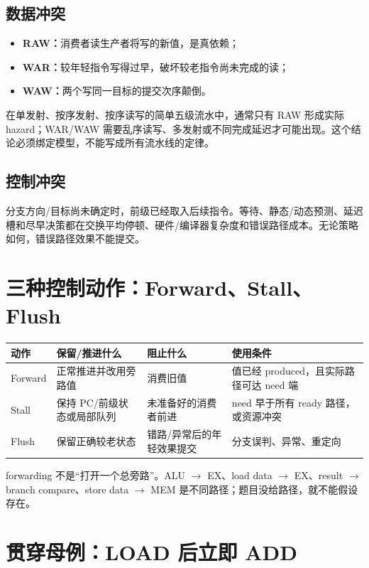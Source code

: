 \documentclass[UTF8,fontset=fandol,11pt,a4paper]{ctexart}
\newcommand{\kw}[1]{\textbf{\color{deep}#1}}
\begin{document}
\subsection{数据冲突}
\begin{itemize}
  \item \kw{RAW：}消费者读生产者将写的新值，是真依赖；
  \item \kw{WAR：}较年轻指令写得过早，破坏较老指令尚未完成的读；
  \item \kw{WAW：}两个写同一目标的提交次序颠倒。
\end{itemize}

在单发射、按序发射、按序读写的简单五级流水中，通常只有 RAW 形成实际 hazard；WAR/WAW 需要乱序读写、多发射或不同完成延迟才可能出现。这个结论必须绑定模型，不能写成所有流水线的定律。

\subsection{控制冲突}
分支方向/目标尚未确定时，前级已经取入后续指令。等待、静态/动态预测、延迟槽和尽早决策都在交换平均停顿、硬件/编译器复杂度和错误路径成本。无论策略如何，错误路径效果不能提交。

\section{三种控制动作：Forward、Stall、Flush}

\begin{center}
\small
\begin{tabularx}{\linewidth}{L{2.0cm}Y Y Y}
\toprule
动作 & 保留/推进什么 & 阻止什么 & 使用条件\\
\midrule
Forward & 正常推进并改用旁路值 & 消费旧值 & 值已经 produced，且实际路径可达 need 端\\
Stall & 保持 PC/前级状态或局部队列 & 未准备好的消费者前进 & need 早于所有 ready 路径，或资源冲突\\
Flush & 保留正确较老状态 & 错路/异常后的年轻效果提交 & 分支误判、异常、重定向\\
\bottomrule
\end{tabularx}
\end{center}

forwarding 不是“打开一个总旁路”。ALU $\to$ EX、load data $\to$ EX、result $\to$ branch compare、store data $\to$ MEM 是不同路径；题目没给路径，就不能假设存在。

\section{贯穿母例：LOAD 后立即 ADD}
\end{document}
